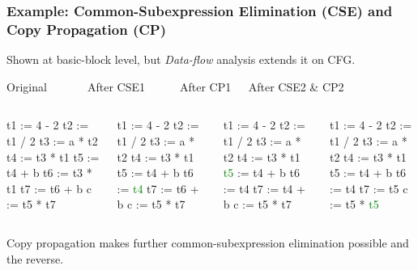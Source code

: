 \documentclass{beamer}
\newcommand{\green}[1]{\textcolor{Green}{{#1}}}
\newcommand{\emp}[1]{\textcolor{DikuRed}{ #1}}
\begin{document}
\begin{frame}[fragile,t]
    \frametitle{Example: Common-Subexpression Elimination
                    (CSE) and Copy Propagation (CP)}

Shown at basic-block level, but {\em Data-flow} analysis extends it on CFG.

\begin{block}{Original{\tt~~~~~~~}After CSE1{\tt~~~~~~}After CP1{\tt~~~}After CSE2 \& CP2}
\begin{columns}
\begin{colorcode}[fontsize=\scriptsize]
t1 := 4  - 2
t2 := t1 / 2
t3 := a  * t2
t4 := \emp{t3 * t1}
t5 := t4 + b
t6 := \emp{t3 * t1}
t7 := t6 + b
c  := t5 * t7
\end{colorcode} 
\begin{colorcode}[fontsize=\scriptsize]
t1 := 4  - 2
t2 := t1 / 2
t3 := a  * t2
t4 := t3 * t1
t5 := t4 + b
\emp{t6} := \green{t4}
t7 := \emp{t6} + b
c  := t5 * t7
\end{colorcode} 
\begin{colorcode}[fontsize=\scriptsize]
t1 := 4  - 2
t2 := t1 / 2
t3 := a  * t2
t4 := t3 * t1
\green{t5} := \emp{t4 + b}
t6 := t4
t7 := \emp{t4 + b}
c  := t5 * t7
\end{colorcode} 
\begin{colorcode}[fontsize=\scriptsize]
t1 := 4  - 2
t2 := t1 / 2
t3 := a  * t2
t4 := t3 * t1
t5 := \emp{t4 + b}
t6 := t4
t7 := t5
c  := t5 * \green{t5}
\end{colorcode} 
\end{columns}
\end{block}

\bigskip

Copy propagation makes further common-subexpression elimination
possible and the reverse.

\end{frame}
\end{document}
